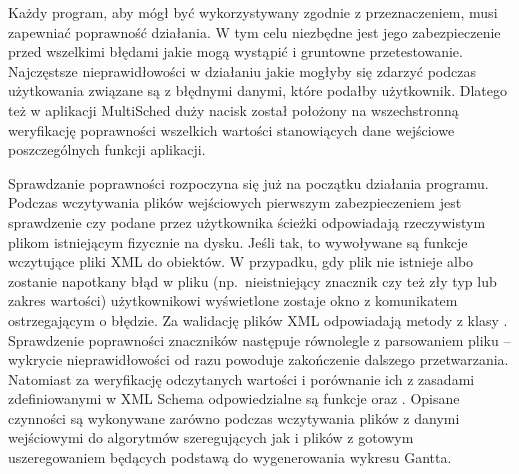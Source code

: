 Każdy program, aby mógł być wykorzystywany zgodnie z przeznaczeniem, musi zapewniać poprawność działania. W tym celu niezbędne jest jego zabezpieczenie 
przed wszelkimi błędami jakie mogą wystąpić i gruntowne przetestowanie. Najczęstsze nieprawidłowości w działaniu jakie mogłyby się zdarzyć podczas 
użytkowania związane są z błędnymi danymi, które podałby użytkownik. Dlatego też w aplikacji MultiSched duży nacisk został położony na wszechstronną 
weryfikację poprawności wszelkich wartości stanowiących dane wejściowe poszczególnych funkcji aplikacji.

Sprawdzanie poprawności rozpoczyna się już na początku działania programu. Podczas wczytywania plików wejściowych pierwszym zabezpieczeniem 
jest sprawdzenie czy podane przez użytkownika ścieżki odpowiadają rzeczywistym plikom istniejącym fizycznie na dysku. Jeśli tak, to wywoływane są 
funkcje wczytujące pliki XML do obiektów. W przypadku, gdy plik nie istnieje albo zostanie napotkany błąd w pliku (np.~nieistniejący znacznik czy 
też zły typ lub zakres wartości) użytkownikowi wyświetlone zostaje okno z komunikatem ostrzegającym o błędzie. Za walidację plików XML odpowiadają 
metody z klasy . Sprawdzenie poprawności znaczników następuje równolegle z parsowaniem pliku -- wykrycie nieprawidłowości od razu 
powoduje zakończenie dalszego przetwarzania. Natomiast za weryfikację odczytanych wartości i porównanie ich z zasadami zdefiniowanymi w XML Schema 
odpowiedzialne są funkcje  oraz . Opisane czynności 
są wykonywane zarówno podczas wczytywania plików z danymi wejściowymi do algorytmów szeregujących jak i plików z gotowym uszeregowaniem będących 
podstawą do wygenerowania wykresu Gantta.

